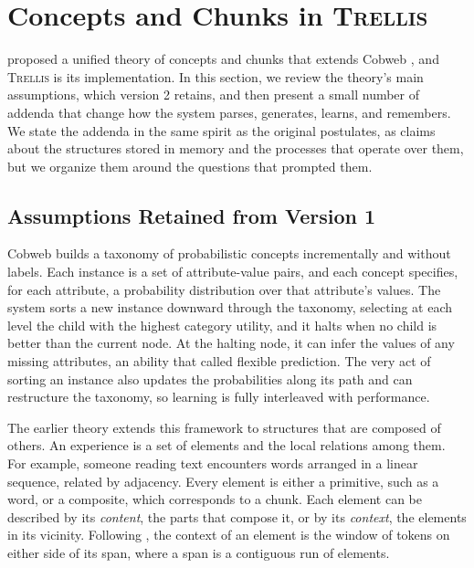 \documentclass[11pt,letterpaper]{article}
\newcommand{\trellis}{\textsc{Trellis}}
\begin{document}
\section{Concepts and Chunks in \trellis{}}

\citet{singaravadivelan-langley-acs} proposed a unified theory of concepts and chunks
that extends Cobweb \citep{fisher-cobweb}, and \trellis{} is its implementation. In this
section, we review the theory's main assumptions, which version 2 retains, and then
present a small number of addenda that change how the system parses, generates, learns,
and remembers. We state the addenda in the same spirit as the original postulates, as
claims about the structures stored in memory and the processes that operate over them,
but we organize them around the questions that prompted them.

\subsection{Assumptions Retained from Version 1}

Cobweb builds a taxonomy of probabilistic concepts incrementally and without labels.
Each instance is a set of attribute-value pairs, and each concept specifies, for each
attribute, a probability distribution over that attribute's values. The system sorts a
new instance downward through the taxonomy, selecting at each level the child with the
highest category utility, and it halts when no child is better than the current node.
At the halting node, it can infer the values of any missing attributes, an ability that
\citet{fisher-cobweb} called flexible prediction. The very act of sorting an instance
also updates the probabilities along its path and can restructure the taxonomy, so
learning is fully interleaved with performance.

The earlier theory extends this framework to structures that are composed of others.
An experience is a set of elements and the local relations among them. For example,
someone reading text encounters words arranged in a linear sequence, related by
adjacency. Every element is either a primitive, such as a word, or a composite, which
corresponds to a chunk. Each element can be described by its {\it content\/}, the parts
that compose it, or by its {\it context\/}, the elements in its vicinity. Following
\citet{maclellan-cobweb-language}, the context of an element is the window of tokens on
either side of its span, where a span is a contiguous run of elements.
\end{document}
